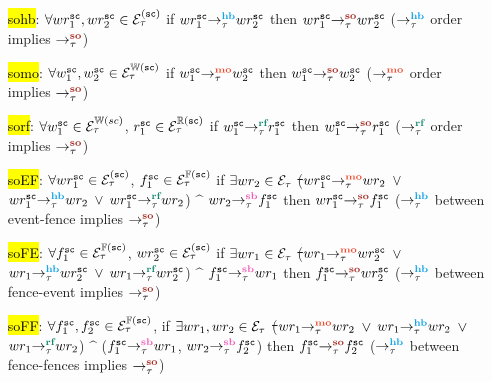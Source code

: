 \begin{itemize}[label=soFFnrf,align=left,leftmargin=*]
	\item [\hl{sohb}:] $\forall wr^{\texttt{sc}}_1, wr^{\texttt{sc}}_2 \in \mathcal{E}^{(\texttt{sc})}_\tau$ if 
			$\hb{\tau}{wr^{\sc}_1}{wr^{\sc}_2}$ then 
			$\so{\tau}{wr^{\sc}_1}{wr^{\sc}_2}$ \newline
			($\setHB$ order implies $\setSO$)
	
	\item [\hl{somo}:] $\forall w^{\texttt{sc}}_1, w^{\texttt{sc}}_2 \in \mathcal{E}^{\mathbb{W}(\texttt{sc})}_\tau$ if 
			$\mo{\tau}{w^{\sc}_1}{w^{\sc}_2}$
			then $\so{\tau}{w^{\sc}_1}{w^{\sc}_2}$ \newline
			($\setMO$ order implies $\setSO$)
			
	\item [\hl{sorf}:] $\forall w^{\texttt{sc}}_1 \in \mathcal{E}^{\mathbb{W}(sc)}_\tau$, $r^{\texttt{sc}}_1 \in 
			\mathcal{E}^{\mathbb{R}(\texttt{sc})}_\tau$ if $\rf{\tau}{w^{\sc}_1}{r^{\sc}_1}$ then 
			$\so{\tau}{w^{\sc}_1}{r^{\sc}_1}$ \newline
			($\setRF$ order implies $\setSO$)
			
	\item [\hl{soEF}:] $\forall wr^\texttt{sc}_1 \in \mathcal{E}^{(\texttt{sc})}_\tau$, $f^\texttt{sc}_1 \in
			\mathcal{E}^{\mathbb{F}(\texttt{sc})}_\tau$ if $\exists wr_2 \in \mathcal{E}_\tau$ \st 
			($\mo{\tau}{wr^\sc_1}{wr_2}$ $\vee$ $\hb{\tau}{wr^\sc_1}{wr_2}$
			$\vee$ $\rf{\tau}{wr^\sc_1}{wr_2}$) $\^$ $\seqb{\tau}{wr_2}{f^\sc_1}$ 
			then $\so{\tau}{wr^\sc_1}{f^\sc_1}$\newline
			($\setHB$ between \sc event-fence implies $\setSO$)
			
	\item [\hl{soFE}:] $\forall f^\texttt{sc}_1 \in \mathcal{E}^{\mathbb{F}(\texttt{sc})}_\tau$, $wr^\texttt{sc}_2 \in
			\mathcal{E}^{(\texttt{sc})}_\tau$ if $\exists wr_1 \in \mathcal{E}_\tau$ \st 
			($\mo{\tau}{wr_1}{wr^\sc_2}$ $\vee$ $\hb{\tau}{wr_1}{wr^\sc_2}$
			$\vee$ $\rf{\tau}{wr_1}{wr^\sc_2}$) $\^$ $\seqb{\tau}{f^\sc_1}{wr_1}$ 
			then $\so{\tau}{f^\sc_1}{wr^\sc_2}$\newline
			($\setHB$ between fence-\sc event implies $\setSO$)
			
	\item [\hl{soFF}:]  $\forall f^{\texttt{sc}}_1, f^{\texttt{sc}}_2 \in \mathcal{E}^{\mathbb{F}(\texttt{sc})}_\tau$, 
			if $\exists wr_1, wr_2 \in \mathcal{E}_\tau$ \st 
			($\mo{\tau}{wr_1}{wr_2}$ $\vee$ $\hb{\tau}{wr_1}{wr_2}$
			$\vee$ $\rf{\tau}{wr_1}{wr_2}$) $\^$
			($\seqb{\tau}{f^{\sc}_1}{wr_1}$, $\seqb{\tau}{wr_2}{f^{\sc}_2}$) 
			then $\so{\tau}{f^{\sc}_1}{f^{\sc}_2}$ \newline
			($\setHB$ between \sc fence-fences implies $\setSO$)
			

\end{itemize}

